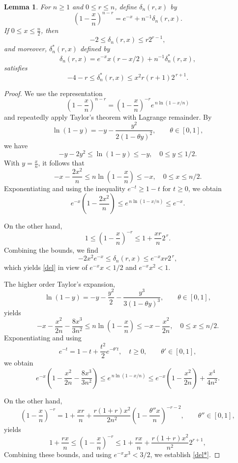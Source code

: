 \documentclass[12]{article}
\newtheorem{lemma}{Lemma} %
\begin{document}
\begin{lemma}\label{L5}
For $n \ge 1$ and $0\le r\le n$, define $\delta_n(r,x)$ by
\[
\left(1-\frac{x}{n}\right)^{n-r} = e^{-x} + n^{-1}\delta_n(r,x).
\]
If $0 \le x \le \frac{n}{2}$, then
\begin{equation}\label{del}
 -2 \le \delta_n(r,x) \le  r2^{r-1},
\end{equation}
and moreover, $\delta^*_n(r,x)$ defined by
\[\delta_n(r,x)=e^{-x}x(r-x/2)+n^{-1}\delta^*_n(r,x),
\]
satisfies 
\begin{equation}\label{del*}
-4-r\le \delta^*_n(r,x)\le x^2r(r+1) 2^{\,r+1}.
\end{equation}
\end{lemma}

\begin{proof}
We use the representation
\[
\left(1-\frac{x}{n}\right)^{n-r}
= \left(1-\frac{x}{n}\right)^{-r} e^{\,n\ln(1-x/n)}
\]
and repeatedly apply Taylor's theorem with Lagrange remainder. By
\[
\ln(1-y) = -y - \frac{y^2}{2(1-\theta y)^2}, \qquad \theta \in [0,1],
\]
we have
\[
-y - 2y^2\le \ln(1-y)\le -y,\quad 0\le y\le 1/2.
\]
With $y = \frac{x}{n}$, it follows that
\[
-x - \frac{2x^2}{n}
\le n\ln\left(1-\frac{x}{n}\right)
\le -x,\quad 0\le x\le n/2.
\]
Exponentiating and using the inequality $e^{-t} \ge 1 - t$ for $t \ge 0$, we obtain
\[
e^{-x}\left(1 - \frac{2x^2}{n}\right)
\le e^{\,n\ln(1-x/n)}
\le e^{-x}.
\]

On the other hand,\[
1 \le \left(1-\frac{x}{n}\right)^{-r}
\le 1 + \frac{xr}{n}2^{\,r}.
\]
Combining the bounds, we find
\[
-2x^2 e^{-x}
\le \delta_n(r,x)
\le e^{-x} x r 2^{\,r},
\]
which  yields \eqref{del} in view of $e^{-x}x<1/2$ and $e^{-x}x^2<1$.

The higher order Taylor's expansion,
\[
\ln(1-y) = -y - \frac{y^2}{2}- \frac{y^3}{3(1-\theta y)^3}, \qquad \theta \in [0,1],
\]
yields
\[
-x - \frac{x^2}{2n}- \frac{8x^3}{3n^2}
\le n\ln\left(1-\frac{x}{n}\right)
\le -x- \frac{x^2}{2n},\quad 0\le x\le n/2.
\]
Exponentiating and using 
\[e^{-t} = 1 - t+\frac{t^2}{2}e^{-\theta't},\quad t \ge 0, \qquad \theta' \in [0,1],\]
we obtain
\[
e^{-x}\left(1 - \frac{x^2}{2n}- \frac{8x^3}{3n^2}\right)
\le e^{\,n\ln(1-x/n)}
\le e^{-x}\left(1 - \frac{x^2}{2n}\right)+\frac{x^4}{4n^2}.
\]

On the other hand,
\[
 \left(1-\frac{x}{n}\right)^{-r}
= 1 + \frac{xr}{n}+\frac{r(1+r)x^2}{2n^2}\left(1-\frac{\theta''x}{n}\right)^{-r-2}, \qquad \theta'' \in [0,1],
\]
yields
\[
1 + \frac{rx}{n}\le \left(1-\frac{x}{n}\right)^{-r}
\le 1 + \frac{rx}{n}+\frac{r(1+r)x^2}{n^2}2^{r+1},
\]
Combining these bounds, and using $e^{-x}x^3<3/2$, we establish \eqref{del*}.
\end{proof}
\end{document}
